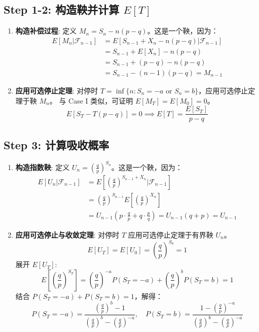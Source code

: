\documentclass[12pt, a4paper, oneside, fontset=windows]{ctexbook}
\begin{document}
\subsection{Step 1-2: 构造鞅并计算 $E[T]$}
\begin{enumerate}
    \item \textbf{构造补偿过程}: 定义 $M_n = S_n - n(p-q)$。这是一个鞅，因为：
    \begin{align*}
        E[M_n|\mathcal{F}_{n-1}] &= E[S_{n-1}+X_n - n(p-q) | \mathcal{F}_{n-1}] \\
        &= S_{n-1} + E[X_n] - n(p-q) \\
        &= S_{n-1} + (p-q) - n(p-q) \\
        &= S_{n-1} - (n-1)(p-q) = M_{n-1}
    \end{align*}
    \item \textbf{应用可选停止定理}: 对停时 $T = \inf\{n: S_n=-a \text{ or } S_n=b\}$，应用可选停止定理于鞅 $M_n$。
    与 Case I 类似，可证明 $E[M_T] = E[M_0] = 0$。
    \[ E[S_T - T(p-q)] = 0 \implies E[T] = \frac{E[S_T]}{p-q} \]
\end{enumerate}

\subsection{Step 3: 计算吸收概率}
\begin{enumerate}
    \item \textbf{构造指数鞅}: 定义 $U_n = \left(\frac{q}{p}\right)^{S_n}$。这是一个鞅，因为：
    \begin{align*}
        E[U_n|\mathcal{F}_{n-1}] &= E\left[\left(\frac{q}{p}\right)^{S_{n-1}+X_n} \Big| \mathcal{F}_{n-1}\right] \\
        &= \left(\frac{q}{p}\right)^{S_{n-1}} E\left[\left(\frac{q}{p}\right)^{X_n}\right] \\
        &= U_{n-1} \left( p \cdot \frac{q}{p} + q \cdot \frac{p}{q} \right) = U_{n-1} (q+p) = U_{n-1}
    \end{align*}
    \item \textbf{应用可选停止与收敛定理}: 对停时 $T$ 应用可选停止定理于有界鞅 $U_n$。
    \[ E[U_T] = E[U_0] = \left(\frac{q}{p}\right)^{S_0} = 1 \]
    展开 $E[U_T]$:
    \[ E\left[\left(\frac{q}{p}\right)^{S_T}\right] = \left(\frac{q}{p}\right)^{-a} P(S_T=-a) + \left(\frac{q}{p}\right)^{b} P(S_T=b) = 1 \]
    结合 $P(S_T=-a) + P(S_T=b) = 1$，解得：
    \[ P(S_T=-a) = \frac{\left(\frac{q}{p}\right)^b - 1}{\left(\frac{q}{p}\right)^b - \left(\frac{q}{p}\right)^{-a}}, \quad P(S_T=b) = \frac{1 - \left(\frac{q}{p}\right)^{-a}}{\left(\frac{q}{p}\right)^b - \left(\frac{q}{p}\right)^{-a}} \]
\end{enumerate}
\end{document}
